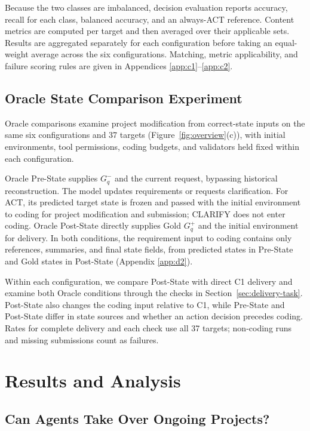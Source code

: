 \documentclass{article} %
\begin{document}
Because the two classes are imbalanced, decision evaluation reports accuracy, recall for each class, balanced accuracy, and an always-ACT reference. Content metrics are computed per target and then averaged over their applicable sets. Results are aggregated separately for each configuration before taking an equal-weight average across the six configurations. Matching, metric applicability, and failure scoring rules are given in Appendices \ref{app:c1}–\ref{app:c2}.

\subsection{Oracle State Comparison Experiment}
\label{sec:oracle-experiment}

Oracle comparisons examine project modification from correct-state inputs on the same six configurations and 37 targets (Figure~\ref{fig:overview}(c)), with initial environments, tool permissions, coding budgets, and validators held fixed within each configuration.

Oracle Pre-State supplies $G_q^-$ and the current request, bypassing historical reconstruction. The model updates requirements or requests clarification. For ACT, its predicted target state is frozen and passed with the initial environment to coding for project modification and submission; CLARIFY does not enter coding. Oracle Post-State directly supplies Gold $G_q^+$ and the initial environment for delivery. In both conditions, the requirement input to coding contains only references, summaries, and final state fields, from predicted states in Pre-State and Gold states in Post-State (Appendix \ref{app:d2}).

Within each configuration, we compare Post-State with direct C1 delivery and examine both Oracle conditions through the checks in Section~\ref{sec:delivery-task}. Post-State also changes the coding input relative to C1, while Pre-State and Post-State differ in state sources and whether an action decision precedes coding. Rates for complete delivery and each check use all 37 targets; non-coding runs and missing submissions count as failures.

\section{Results and Analysis}
\label{sec:results}

\subsection{Can Agents Take Over Ongoing Projects?}
\label{sec:results-delivery}
\end{document}
